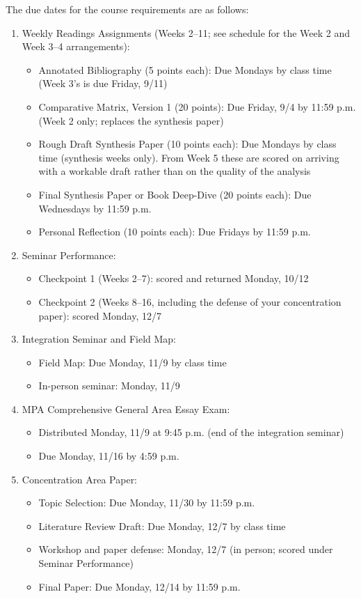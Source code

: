 \documentclass[11pt]{article}     %
\begin{document}
The due dates for the course requirements are as follows:
\begin{enumerate}
    \item Weekly Readings Assignments (Weeks 2--11; see schedule for the Week 2 and Week 3--4 arrangements):
        \begin{itemize}
            \item Annotated Bibliography (5 points each): Due Mondays by class time (Week 3's is due Friday, 9/11)
            \item Comparative Matrix, Version 1 (20 points): Due Friday, 9/4 by 11:59 p.m. (Week 2 only; replaces the synthesis paper)
            \item Rough Draft Synthesis Paper (10 points each): Due Mondays by class time (synthesis weeks only). From Week 5 these are scored on arriving with a workable draft rather than on the quality of the analysis
            \item Final Synthesis Paper or Book Deep-Dive (20 points each): Due Wednesdays by 11:59 p.m.
            \item Personal Reflection (10 points each): Due Fridays by 11:59 p.m.
        \end{itemize}
    \item Seminar Performance:
        \begin{itemize}
            \item Checkpoint 1 (Weeks 2--7): scored and returned Monday, 10/12
            \item Checkpoint 2 (Weeks 8--16, including the defense of your concentration paper): scored Monday, 12/7
        \end{itemize}
    \item Integration Seminar and Field Map:
        \begin{itemize}
            \item Field Map: Due Monday, 11/9 by class time
            \item In-person seminar: Monday, 11/9
        \end{itemize}
    \item MPA Comprehensive General Area Essay Exam:
        \begin{itemize}
            \item Distributed Monday, 11/9 at 9:45 p.m. (end of the integration seminar)
            \item Due Monday, 11/16 by 4:59 p.m.
        \end{itemize}
    \item Concentration Area Paper:
        \begin{itemize}
            \item Topic Selection: Due Monday, 11/30 by 11:59 p.m.
            \item Literature Review Draft: Due Monday, 12/7 by class time
            \item Workshop and paper defense: Monday, 12/7 (in person; scored under Seminar Performance)
            \item Final Paper: Due Monday, 12/14 by 11:59 p.m.
        \end{itemize}
\end{enumerate}
\end{document}
